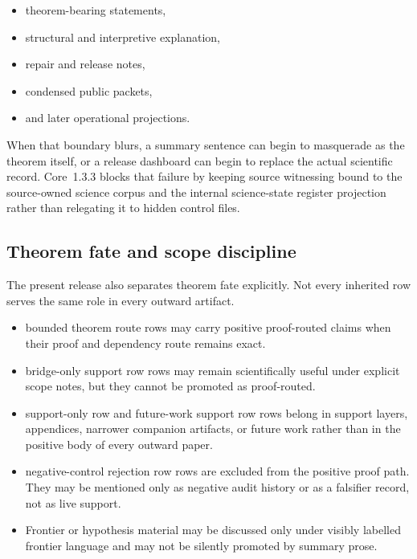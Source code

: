 \begin{itemize}
\item theorem-bearing statements,
\item structural and interpretive explanation,
\item repair and release notes,
\item condensed public packets,
\item and later operational projections.
\end{itemize}

When that boundary blurs, a summary sentence can begin to masquerade as the
theorem itself, or a release dashboard can begin to replace the actual
scientific record. Core~1.3.3 blocks that failure by keeping source witnessing
bound to the source-owned science corpus and the internal science-state register projection
rather than relegating it to hidden control files.

\subsection{Theorem fate and scope discipline}

The present release also separates theorem fate explicitly. Not every inherited
row serves the same role in every outward artifact.

\begin{itemize}
\item bounded theorem route rows may carry positive proof-routed claims
      when their proof and dependency route remains exact.
\item bridge-only support row rows may remain scientifically useful under
      explicit scope notes, but they cannot be promoted as proof-routed.
\item support-only row and future-work support row rows belong in support
      layers, appendices, narrower companion artifacts, or future work rather
      than in the positive body of every outward paper.
\item negative-control rejection row rows are excluded from the positive proof path. They may
      be mentioned only as negative audit history or as a falsifier record, not
      as live support.
\item Frontier or hypothesis material may be discussed only under visibly
      labelled frontier language and may not be silently promoted by summary
      prose.
\end{itemize}

